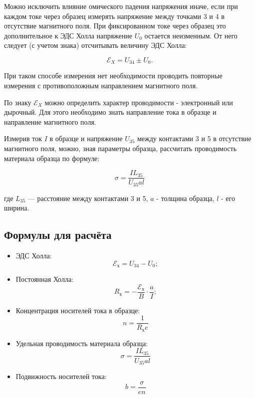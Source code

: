 \documentclass[a4paper]{article}
\theoremstyle{definition}
\theoremstyle{remark}
\begin{document}
  	Можно исключить влияние омического падения напряжения иначе, если при каждом токе через образец измерять напряжение между точками 3 и 4 в отсутствие магнитного поля. При фиксированном токе через образец это дополнительное к ЭДС Холла напряжение $U_{0}$ остается неизменным. От него следует (с учетом
  	знака) отсчитывать величину ЭДС Холла: 
  	
  	$$\mathscr{E}_{X} = U_{34} \pm U_{0}.$$
  	
  	При таком способе измерения нет необходимости проводить повторные измерения с противоположным направлением магнитного поля.
  	
  	
  	По знаку $\mathscr{E}_{X}$ можно определить характер проводимости - электронный или дырочный. Для этого необходимо знать направление тока в образце и направление
  	магнитного поля. \medskip
  	
  	Измерив ток $I$ в образце и напряжение $U_{35}$ между контактами 3 и 5 в отсутствие магнитного поля, можно, зная параметры образца, рассчитать проводимость материала образца по формуле:
  	
  \begin{equation*}
  	\sigma=\dfrac{IL_{35}}{U_{35}al}
  \end{equation*}
  	
  	где $L_{35}$ --- расстояние между контактами 3 и 5, $a$ - толщина образца, $l$ - его ширина.

\subsection{Формулы для расчёта}

\begin{itemize}
    \item
        ЭДС Холла:
        \begin{equation}
            \mathscr{E_\text{х}} = U_{34} - U_0;
        \end{equation}
    \item
        Постоянная Холла:
        \begin{equation}
            R_\text{х} = -\frac{\mathscr{E_\text{х}}}{B} \cdot \frac{a}{I};
        \end{equation}
    \item
        Концентрация носителей тока в образце:
        \begin{equation}
            n = \frac{1}{R_\text{х} e}
        \end{equation}
    \item
        Удельная проводимость материала образца:
        \begin{equation}
            \sigma = \frac{I L_{35}}{U_{35}al}
        \end{equation}
    \item
        Подвижность носителей тока:
        \begin{equation}
            b = \frac{\sigma}{en}
        \end{equation}
    
\end{itemize}
\end{document}
